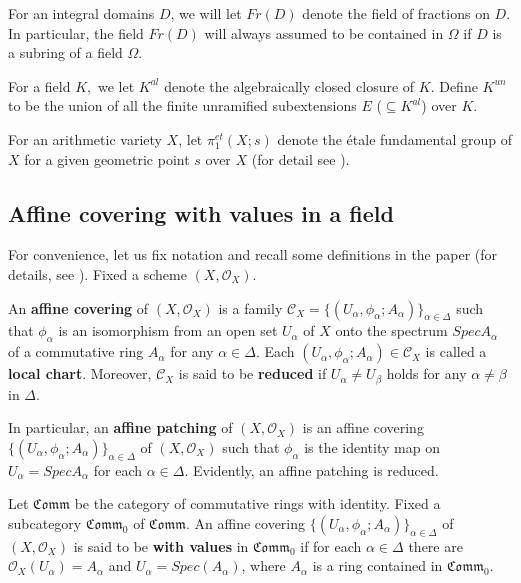 \documentclass[12pt,twoside,reqno]{amsart}
\theoremstyle{definition}
\numberwithin{equation}{section}
\begin{document}
For an integral domains $D$, we will let $Fr(D)$ denote the field of
fractions on $D$. In particular, the field $Fr(D)$ will always assumed to be
contained in $\Omega $ if $D$ is a subring of a field $\Omega $.

For a field $K,$ we let $K^{al}$ denote the algebraically closed closure of $K.$ Define $K^{un}$ to be the union of all the finite unramified
subextensions $E$ ($\subseteq K^{al}$) over $K.$

For an arithmetic variety $X$, let $\pi _{1}^{et}\left( X;s\right) $ denote
the \'{e}tale fundamental group of $X$ for a given geometric point $s$ over $X$ (for detail see \cite{F-K,SGA1,Mln}).

\subsection{Affine covering with values in a field}

For convenience, let us fix notation and recall some definitions in the
paper (for details, see \cite{An1,An2,An3}). Fixed a scheme $(X,\mathcal{O}_{X})$.

An \textbf{affine covering} of $(X,\mathcal{O}_{X})$ is a family $\mathcal{C}_{X}=\{(U_{\alpha },\phi _{\alpha };A_{\alpha })\}_{\alpha \in \Delta }$
such that $\phi _{\alpha }$ is an isomorphism from an open set $U_{\alpha }$
of $X$ onto the spectrum $Spec{A_{\alpha }}$ of a commutative ring $A_{\alpha }$ for any $\alpha \in \Delta $. Each $(U_{\alpha },\phi _{\alpha
};A_{\alpha })\in \mathcal{C}_{X}$ is called a \textbf{local chart}.
Moreover, $\mathcal{C}_{X}$ is said to be \textbf{reduced} if $U_{\alpha
}\neq U_{\beta }$ holds for any $\alpha \neq \beta $ in $\Delta $.

In particular, an \textbf{affine patching} of $(X,\mathcal{O}_{X})$ is an
affine covering $\{(U_{\alpha },\phi _{\alpha };A_{\alpha })\}_{\alpha \in
\Delta }$ of $(X,\mathcal{O}_{X})$ such that $\phi _{\alpha }$ is the
identity map on $U_{\alpha }=SpecA_{\alpha }$ for each $\alpha \in \Delta .$
Evidently, an affine patching is reduced.

Let $\mathfrak{Comm}$ be the category of commutative rings with identity.
Fixed a subcategory $\mathfrak{Comm}_{0}$ of $\mathfrak{Comm}$. An affine
covering $\{(U_{\alpha},\phi_{\alpha};A_{\alpha })\}_{\alpha \in \Delta}$ of
$(X, \mathcal{O}_{X})$ is said to be \textbf{with values} in $\mathfrak{Comm}_{0}$ if
 for each $\alpha \in \Delta $ there are $\mathcal{O}_{X}(U_{\alpha})=A_{\alpha}$ and $U_{\alpha}=Spec(A_{\alpha})$, where
 $A_{\alpha }$ is a ring contained in $\mathfrak{Comm}_{0}$.
\end{document}
